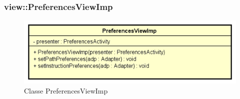 \documentclass[../DefinizioneDiProdotto.tex]{subfiles}
\begin{document}
\subsubsection{view::PreferencesViewImp}

    \begin{figure}[H]
        \centering
        \includegraphics{img/PreferencesViewImp.png}
        \caption{Classe PreferencesViewImp}\label{fig:view::PreferencesViewImp} 
    \end{figure}
\end{document}
